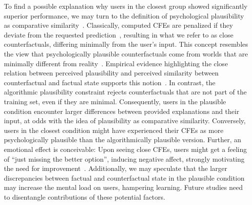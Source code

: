 {%
To find a possible explanation why users in the closest group showed significantly superior performance, we may turn to the definition of psychological plausibility as comparative similarity~\citep{lewis_counterfactuals_1973, stanley_counterfactual_2017}. 
Classically, computed CFEs are penalized if they deviate from the requested prediction~\citep{wachter_counterfactual_2017}, resulting in what we refer to as close counterfactuals, differing minimally from the user’s input.
This concept resembles the view that psychologically plausible counterfactuals come from worlds that are minimally different from reality~\citep{lewis_counterfactuals_1973}.
Empirical evidence highlighting the close relation between perceived plausibility and perceived similarity between counterfactual and factual state supports this notion~\citep{stanley_counterfactual_2017, de_brigard_perceived_2021}.
In contrast, the algorithmic plausibility constraint rejects counterfactuals that are not part of the training set, even if they are minimal.
Consequently, users in the plausible condition encounter larger differences between provided explanations and their input, at odds with the idea of plausibility as comparative similarity.
Conversely, users in the closest condition might have experienced their \glspl{CFE} as more psychologically plausible than the algorithmically plausible version.
Further, an emotional effect is conceivable: Upon seeing close \glspl{CFE}, users might get a feeling of ``just missing the better option'', inducing negative affect, strongly motivating the need for improvement~\citep{medvec_when_1997, markman_reflection_2003}.
Additionally, we may speculate that the larger discrepancies between factual and counterfactual state in the plausible condition may increase the mental load on users, hampering learning.
Future studies need to disentangle contributions of these potential factors.

}
